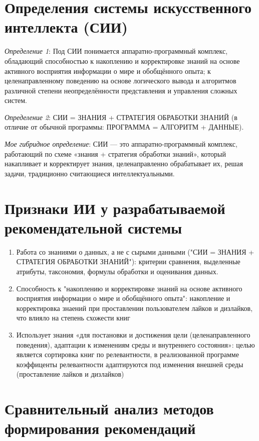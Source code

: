 \chapter{Определения системы искусственного интеллекта (СИИ)}

\textit{Определение 1}: Под СИИ понимается аппаратно-программный комплекс, обладающий способностью к накоплению и корректировке знаний на основе активного восприятия информации о мире и обобщённого опыта; к целенаправленному поведению на основе логического вывода и алгоритмов различной степени неопределённости представления и управления сложных систем.

\textit{Определение 2}:  СИИ = ЗНАНИЯ + СТРАТЕГИЯ ОБРАБОТКИ ЗНАНИЙ (в отличие от обычной программы: ПРОГРАММА = АЛГОРИТМ + ДАННЫЕ).

\textit{Мое гибридное определение}: СИИ — это аппаратно-программный комплекс, работающий по схеме «знания + стратегия обработки знаний», который накапливает и корректирует знания, целенаправленно обрабатывает их, решая задачи, традиционно считающиеся интеллектуальными.

\chapter{Признаки ИИ у разрабатываемой рекомендательной системы}
\begin{enumerate}
\item Работа со знаниями о данных, а не с сырыми данными ("СИИ = ЗНАНИЯ + СТРАТЕГИЯ ОБРАБОТКИ ЗНАНИЙ"): критерии сравнения, выделенные атрибуты, таксономия, формулы обработки и оценивания данных.
\item Способность к "накоплению и корректировке знаний на основе активного восприятия информации о мире и обобщённого опыта": накопление и корректировка знаений при проставлении пользователем лайков и дизлайков, что влияло на степень схожести книг
\item Использует знания «для постановки и достижения цели (целенаправленного поведения), адаптации к изменениям среды и внутреннего состояния»: целью является сортировка книг по релевантности, в реализованной программе коэффиценты релевантности адаптируются под изменения внешней среды (проставление лайков и дизлайков)
\end{enumerate}


\chapter{Сравнительный анализ методов формирования рекомендаций}

